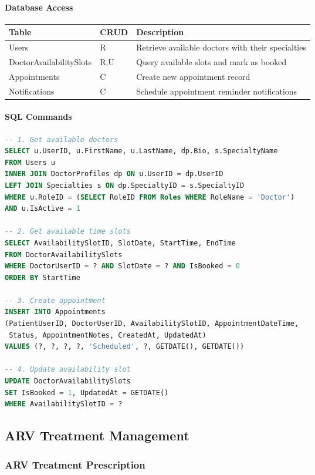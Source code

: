 \documentclass[12pt,a4paper]{article}
\begin{document}
\paragraph{Database Access}

\begin{longtable}{|p{3cm}|p{2cm}|p{9cm}|}
\hline
\textbf{Table} & \textbf{CRUD} & \textbf{Description} \\
\hline
Users & R & Retrieve available doctors with their specialties \\
\hline
DoctorAvailabilitySlots & R,U & Query available slots and mark as booked \\
\hline
Appointments & C & Create new appointment record \\
\hline
Notifications & C & Schedule appointment reminder notifications \\
\hline
\end{longtable}

\paragraph{SQL Commands}

\begin{lstlisting}[language=SQL]
-- 1. Get available doctors
SELECT u.UserID, u.FirstName, u.LastName, dp.Bio, s.SpecialtyName
FROM Users u
INNER JOIN DoctorProfiles dp ON u.UserID = dp.UserID
LEFT JOIN Specialties s ON dp.SpecialtyID = s.SpecialtyID
WHERE u.RoleID = (SELECT RoleID FROM Roles WHERE RoleName = 'Doctor')
AND u.IsActive = 1

-- 2. Get available time slots
SELECT AvailabilitySlotID, SlotDate, StartTime, EndTime
FROM DoctorAvailabilitySlots
WHERE DoctorUserID = ? AND SlotDate = ? AND IsBooked = 0
ORDER BY StartTime

-- 3. Create appointment
INSERT INTO Appointments 
(PatientUserID, DoctorUserID, AvailabilitySlotID, AppointmentDateTime, 
 Status, AppointmentNotes, CreatedAt, UpdatedAt)
VALUES (?, ?, ?, ?, 'Scheduled', ?, GETDATE(), GETDATE())

-- 4. Update availability slot
UPDATE DoctorAvailabilitySlots 
SET IsBooked = 1, UpdatedAt = GETDATE()
WHERE AvailabilitySlotID = ?
\end{lstlisting}

\subsection{ARV Treatment Management}

\subsubsection{ARV Treatment Prescription}
\end{document}
